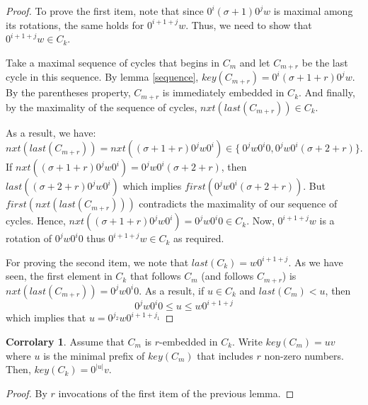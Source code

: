 \documentclass{article}
\theoremstyle{definition}
\newtheorem{corrolary}[theorem]{Corrolary}
\begin{document}
\begin{proof}
	To prove the first item, note that since $0^i(\sigma+1)0^jw$ is maximal among its rotations, the same holds for $0^{i+1+j}w$. Thus, we need to show that $0^{i+1+j}w\in C_k$. 
	
	Take a maximal sequence of cycles that begins in $C_m$ and let $C_{m+r}$ be the last cycle in this sequence. By lemma \ref{sequence}, $key(C_{m+r})=0^i(\sigma+1+r)0^jw$. By the parentheses property, $C_{m+r}$ is immediately embedded in $C_k$. And finally, by the maximality of the sequence of cycles, $nxt(last(C_{m+r}))\in C_k$.
	
	As a result, we have:
	$$nxt(last(C_{m+r}))=nxt((\sigma+1+r)0^jw0^i)\in\{\ 0^jw0^i0, 0^jw0^i(\sigma+2+r)\}.$$ If $nxt((\sigma+1+r)0^jw0^i)= 0^jw0^i(\sigma+2+r)$, then $last((\sigma+2+r)0^jw0^i)$ which implies $first(0^jw0^i(\sigma+2+r))$. But $first(nxt(last(C_{m+r})))$ contradicts the maximality of our sequence of cycles. Hence, $nxt((\sigma+1+r)0^jw0^i)= 0^jw0^i0\in C_k$. Now, $0^{i+1+j}w$ is a rotation of $0^jw0^i0$ thus $0^{i+1+j}w\in C_k$ as required.
	
	For proving the second item, we note that $last(C_k)=w0^{i+1+j}$. As we have seen, the first element in $C_k$ that follows $C_m$ (and follows $C_{m+r}$) is $nxt(last(C_{m+r}))= 0^jw0^i0$. As a result, if $u\in C_k$ and $last(C_m)<u$, then 
	$$0^jw0^i0\leq u \leq w0^{i+1+j}$$
	which implies that $u=0^{j_2}w0^{i+1+j_1}$
\end{proof}

\begin{corrolary}
	\label{embedding-deletes-zeroes}
	Assume that $C_m$ is $r$-embedded in $C_k$. Write $key(C_m)=uv$ where $u$ is the minimal prefix of $key(C_m)$ that includes $r$ non-zero numbers. Then, $key(C_k)=0^{|u|}v$.
\end{corrolary}

\begin{proof}
	By $r$ invocations of the first item of the previous lemma.
\end{proof}
\end{document}
